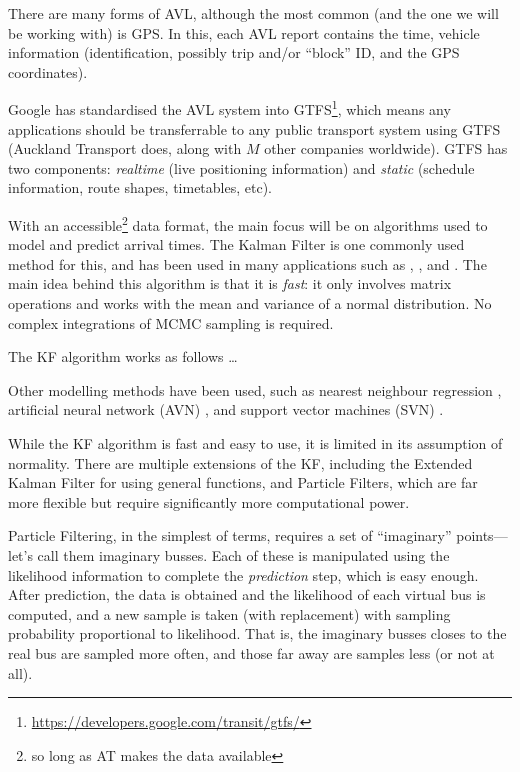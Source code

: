 \documentclass[12pt,a4paper]{article}
\begin{document}
There are many forms of AVL, although the most common (and the one we will be working with) is GPS.
In this, each AVL report contains the time, vehicle information (identification, possibly trip and/or ``block'' ID,
and the GPS coordinates).

Google has standardised the AVL system into GTFS\footnote{\url{https://developers.google.com/transit/gtfs/}}, 
which means any applications should be transferrable to any 
public transport system using GTFS (Auckland Transport does, along with $M$ other companies worldwide).
GTFS has two components: \emph{realtime} (live positioning information) and \emph{static} (schedule information,
route shapes, timetables, etc).


With an accessible\footnote{so long as AT makes the data available} data format, the main focus will be on algorithms
used to model and predict arrival times. The Kalman Filter is one commonly used method for this, and has been used
in many applications such as \cite{cathey-dailey:2003}, \cite{cn}, and \cite{cn}.
The main idea behind this algorithm is that it is \emph{fast}: it only involves matrix operations and works with 
the mean and variance of a normal distribution.
No complex integrations of MCMC sampling is required.


The KF algorithm works as follows \ldots

Other modelling methods have been used, such as
nearest neighbour regression \citep{chang-etal:2010},
artificial neural network (AVN) \citep{jeong-rilett:2005}, and
support vector machines (SVN) \citep{yu-etal:2006,yu-etal:2010,yu-etal:2011}.

While the KF algorithm is fast and easy to use, it is limited in its assumption of normality. 
There are multiple extensions of the KF, including the Extended Kalman Filter for using general functions, 
and Particle Filters, which are far more flexible but require significantly more computational power.

Particle Filtering, in the simplest of terms, requires a set of ``imaginary'' points---let's call them imaginary busses.
Each of these is manipulated using the likelihood information to complete the \emph{prediction} step,
which is easy enough.
After prediction, the data is obtained and the likelihood of each virtual bus is computed,
and a new sample is taken (with replacement) with sampling probability proportional to likelihood.
That is, the imaginary busses closes to the real bus are sampled more often, 
and those far away are samples less (or not at all).
\end{document}
